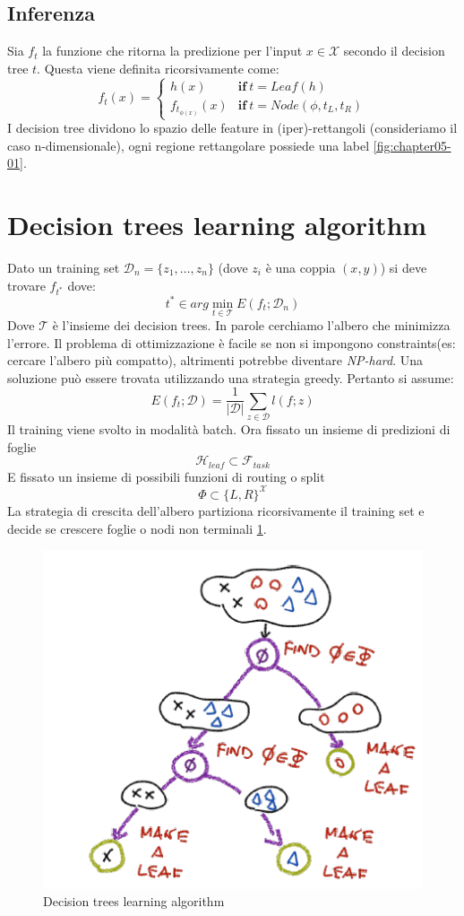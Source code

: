 	\subsection{Inferenza}
	Sia $f_t$ la funzione che ritorna la predizione per l'input $x\in\mathcal{X}$ secondo il decision tree $t$.
	Questa viene definita ricorsivamente come:
	$$f_t(x)=\begin{cases}h(x)&\mathbf{if}\ t = Leaf(h)\\
										 f_{t_{\phi(x)}}(x)&\mathbf{if}\ t = Node(\phi, t_L, t_R)
				\end{cases}$$
	I decision tree dividono lo spazio delle feature in (iper)-rettangoli (consideriamo il caso n-dimensionale), ogni regione rettangolare possiede una label \ref{fig:chapter05-01}.

\section{Decision trees learning algorithm}
Dato un training set $\mathcal{D}_n = \{z_1,\dots, z_n\}$ (dove $z_i$ \`e una coppia $(x,y)$) si deve trovare $f_{t^*}$ dove:
$$t^*\in arg\min\limits_{t\in\mathcal{T}} E(f_t;\mathcal{D}_n)$$
Dove $\mathcal{T}$ \`e l'insieme dei decision trees. In parole cerchiamo l'albero che minimizza l'errore.
Il problema di ottimizzazione \`e facile se non si impongono constraints(es: cercare l'albero più compatto), altrimenti potrebbe diventare \emph{NP-hard}.
Una soluzione pu\`o essere trovata utilizzando una strategia greedy.
Pertanto si assume:
$$E(f_t;\mathcal{D}) = \dfrac{1}{|\mathcal{D}|}\sum\limits_{z\in\mathcal{D}}l(f;z)$$
Il training viene svolto in modalit\`a batch.
Ora fissato un insieme di predizioni di foglie
$$\mathcal{H}_{leaf}\subset\mathcal{F}_{task}$$
E fissato un insieme di possibili funzioni di routing o split
$$\Phi\subset\{L,R\}^\mathcal{X}$$
La strategia di crescita dell'albero partiziona ricorsivamente il training set e decide se crescere foglie o nodi non terminali \ref{fig:chapter05-02}. 

\begin{figure}
	\centering
	\includegraphics[width=0.4\linewidth]{imgs/chapter5/img2}
	\caption{Decision trees learning algorithm}
	\label{fig:chapter05-02}
\end{figure}


